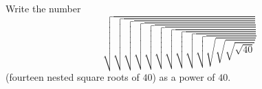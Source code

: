 Write the number
\[\sqrt{\sqrt{\sqrt{\sqrt{\sqrt{\sqrt{\sqrt{\sqrt{\sqrt{\sqrt{\sqrt{\sqrt{\sqrt{\sqrt{40}}}}}}}}}}}}}}\]
(fourteen nested square roots of $40$) as a power of $40$.
